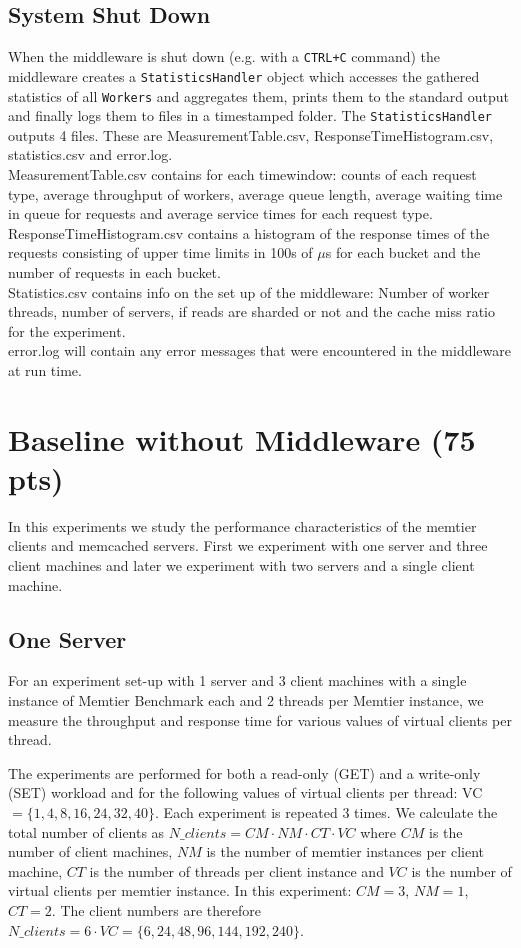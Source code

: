 \documentclass[11pt,a4paper]{article}
\begin{document}
\subsection{System Shut Down}
When the middleware is shut down (e.g. with a \texttt{CTRL+C} command) the middleware creates a \texttt{StatisticsHandler} object which accesses the gathered statistics of all \texttt{Workers} and aggregates them, prints them to the standard output and finally logs them to files in a timestamped folder. The \texttt{StatisticsHandler} outputs 4 files. These are MeasurementTable.csv, ResponseTimeHistogram.csv, statistics.csv and error.log.\\ MeasurementTable.csv contains for each timewindow: counts of each request type, average throughput of workers, average queue length, average waiting time in queue for requests and average service times for each request type. \\ ResponseTimeHistogram.csv contains a histogram of the response times of the requests consisting of upper time limits in 100s of $\mu$s for each bucket and the number of requests in each bucket. \\ Statistics.csv contains info on the set up of the middleware: Number of worker threads, number of servers, if reads are sharded or not and the cache miss ratio for the experiment. \\ error.log will contain any error messages that were encountered in the middleware at run time.


\newpage
\section{Baseline without Middleware (75 pts)}

In this experiments we study the performance characteristics of the memtier clients and memcached servers. First we experiment with one server and three client machines and later we experiment with two servers and a single client machine.

\subsection{One Server}

For an experiment set-up with 1 server and 3 client machines with a single instance of Memtier Benchmark each and 2 threads per Memtier instance, we measure the throughput and response time for various values of virtual clients per thread.

The experiments are performed for both a read-only (GET) and a write-only (SET) workload and for the following values of virtual clients per thread: VC$=\{ 1, 4, 8, 16, 24, 32, 40\}$. Each experiment is repeated 3 times. We calculate the total number of clients as $N\_clients = CM \cdot NM \cdot CT \cdot VC$ where $CM$ is the number of client machines, $NM$ is the number of memtier instances per client machine, $CT$ is the number of threads per client instance and $VC$ is the number of virtual clients per memtier instance. In this experiment: $CM=3$, $NM=1$, $CT=2$. The client numbers are therefore $N\_clients = 6\cdot VC = \{6, 24, 48, 96, 144, 192, 240 \}$.
\end{document}
